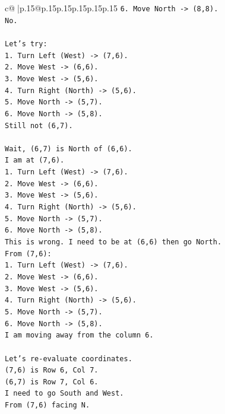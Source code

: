 \documentclass{article}
\begin{document}
{\begin{supertabular}{c@{$\;$}|p{.15\linewidth}@{}p{.15\linewidth}p{.15\linewidth}p{.15\linewidth}p{.15\linewidth}p{.15\linewidth}}
{{{\texttt{6. Move North {-}> (8,8).} \\
\texttt{No.} \\
\\ 
\texttt{Let's try:} \\
\texttt{1. Turn Left (West) {-}> (7,6).} \\
\texttt{2. Move West {-}> (6,6).} \\
\texttt{3. Move West {-}> (5,6).} \\
\texttt{4. Turn Right (North) {-}> (5,6).} \\
\texttt{5. Move North {-}> (5,7).} \\
\texttt{6. Move North {-}> (5,8).} \\
\texttt{Still not (6,7).} \\
\\ 
\texttt{Wait, (6,7) is North of (6,6).} \\
\texttt{I am at (7,6).} \\
\texttt{1. Turn Left (West) {-}> (7,6).} \\
\texttt{2. Move West {-}> (6,6).} \\
\texttt{3. Move West {-}> (5,6).} \\
\texttt{4. Turn Right (North) {-}> (5,6).} \\
\texttt{5. Move North {-}> (5,7).} \\
\texttt{6. Move North {-}> (5,8).} \\
\texttt{This is wrong. I need to be at (6,6) then go North.} \\
\texttt{From (7,6):} \\
\texttt{1. Turn Left (West) {-}> (7,6).} \\
\texttt{2. Move West {-}> (6,6).} \\
\texttt{3. Move West {-}> (5,6).} \\
\texttt{4. Turn Right (North) {-}> (5,6).} \\
\texttt{5. Move North {-}> (5,7).} \\
\texttt{6. Move North {-}> (5,8).} \\
\texttt{I am moving away from the column 6.} \\
\\ 
\texttt{Let's re{-}evaluate coordinates.} \\
\texttt{(7,6) is Row 6, Col 7.} \\
\texttt{(6,7) is Row 7, Col 6.} \\
\texttt{I need to go South and West.} \\
\texttt{From (7,6) facing N.} \\
}}}
\end{supertabular}}
\end{document}
